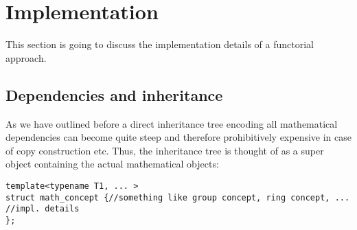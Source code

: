 \section{Implementation}
This section is going to discuss the implementation details of a functorial approach.
\subsection{Dependencies and inheritance}
As we have outlined before a direct inheritance tree encoding all mathematical dependencies can become quite steep and therefore prohibitively expensive in case of copy construction etc. Thus, the inheritance tree is thought of as a super object containing the actual mathematical objects:
\begin{lstlisting}[frame=single]
template<typename T1, ... >
struct math_concept {//something like group concept, ring concept, ...
//impl. details
};

\end{lstlisting}